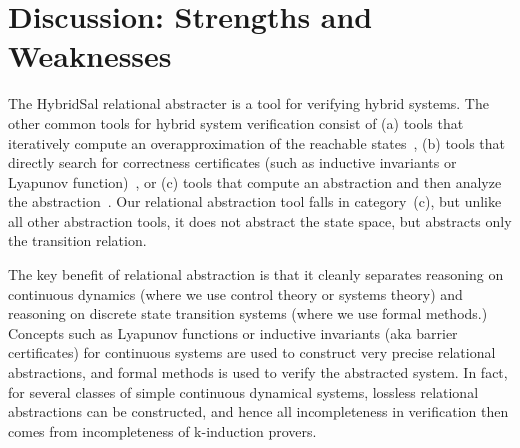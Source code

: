 \documentclass{llncs}
\begin{document}
\section{Discussion: Strengths and Weaknesses}

The HybridSal relational abstracter is a tool for verifying
hybrid systems.  The other common tools for hybrid
system verification consist of 
(a) tools that iteratively compute
an overapproximation of the reachable states~\cite{SpaceExsmall},
(b) tools that directly search for correctness certificates
(such as inductive invariants or Lyapunov function)~\cite{sostools,ST11:ISSACsmall},
or
(c) tools that compute an abstraction and then analyze
the abstraction~\cite{HybridSALsmall,AlurDangIvancic03:TACASsmall,Clarke03:TACASsmall}.
Our relational abstraction tool falls in category~(c), but unlike all
other abstraction tools, it does
not abstract the state space, but abstracts only the transition relation.
 
The key benefit of relational abstraction
is that it cleanly separates reasoning on continuous
dynamics (where we use control theory or systems theory)
and
reasoning on discrete state transition systems (where we use 
formal methods.)
Concepts such as Lyapunov functions or inductive invariants
(aka barrier certificates) for continuous systems are used
to construct very precise relational abstractions, and
formal methods is used to verify the abstracted system.
In fact, for several classes of simple continuous dynamical systems, 
lossless relational abstractions can be constructed, and hence
all incompleteness in verification then comes from incompleteness
of k-induction provers.

\end{document}
